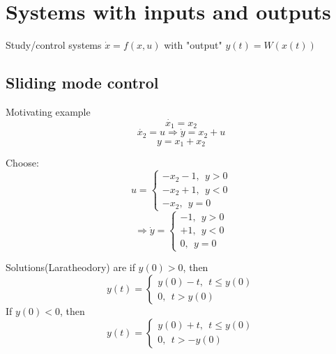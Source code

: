 \section{Systems with inputs and outputs}

Study/control systems $\dot{x} = f(x,u)$ with "output" $y(t)=W(x(t))$

\subsection{Sliding mode control}

Motivating example
\begin{equation*}
\dot{x_1} = x_2
\end{equation*}
\begin{equation*}
\dot{x_2} = u \Rightarrow \dot{y} = x_2 + u
\end{equation*}
\begin{equation*}
y = x_1 + x_2
\end{equation*}

Choose:
\begin{equation*}
u =  \left\{
                \begin{array}{ll}
                  -x_2-1, \ \ y > 0\\
                  -x_2+1, \ \ y < 0\\
                  -x_2, \ \ y=0
                \end{array}
              \right. 
\end{equation*}
\begin{equation*}
\Rightarrow \dot y =  \left\{
                \begin{array}{ll}
                  -1, \ \ y > 0\\
                  +1, \ \ y < 0\\
                  0, \ \ y=0
                \end{array}
              \right. 
\end{equation*}

Solutions(Laratheodory) are if $y(0) > 0$, then 
\begin{equation*}
y(t) = \left\{ \begin{array}{ll}
                  y(0) - t, \ \ t \leq y(0)\\
                  0, \ \ t > y(0)
                \end{array}
              \right. 
\end{equation*}
If $y(0) < 0$, then
\begin{equation*}
y(t) = \left\{ \begin{array}{ll}
                  y(0) + t, \ \ t \leq y(0)\\
                  0, \ \ t > -y(0)
                \end{array}
              \right. 
\end{equation*}

